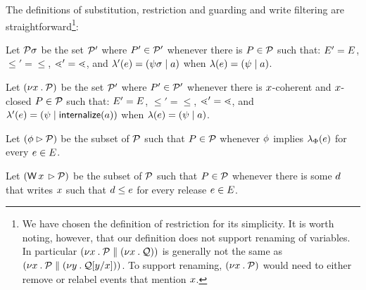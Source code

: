 The definitions of substitution, restriction and guarding and write filtering
are straightforward\footnote{We have chosen the definition of restriction for
  its simplicity.  It is worth noting, however, that our definition does not
  support renaming of variables.  In particular
  $(\nu x\mathbin.\mathcal{P}\parallel(\nu x\mathbin.\mathcal{Q}))$ is generally not the same
  as $(\nu x\mathbin.\mathcal{P}\parallel(\nu y\mathbin.\mathcal{Q}[y/x]))$.  To
  support renaming, $(\nu x\mathbin.\mathcal{P})$ would need to either remove or
  relabel events that mention $x$.}:
\begin{definition}
  Let $\mathcal{P}\sigma$ be the set $\mathcal{P}'$ where $P'\in\mathcal{P}'$ whenever
there is $P\in\mathcal{P}$ such that:
$E' = E$,
${\le'} = {\le}$, 
${\lessdot'} = {\lessdot}$,
and
$\lambda'(e) = (\psi\sigma \mid a)$ when $\lambda(e) = (\psi \mid a)$.


Let $(\nu x\mathbin.\mathcal{P})$ be the set $\mathcal{P}'$ where $P'\in\mathcal{P}'$ whenever
there is $x$-coherent and $x$-closed $P\in\mathcal{P}$ such that:
$E' = E$,
${\le'} = {\le}$, 
${\lessdot'} = {\lessdot}$,
and
$\lambda'(e) = (\psi \mid \mathsf{internalize}(a))$ when $\lambda(e) = (\psi \mid a)$.

Let $(\phi \mathbin\rhd \mathcal{P})$ be the subset of $\mathcal{P}$ such that $P\in\mathcal{P}$ whenever
$\phi$ implies $\lambda_{\Phi}(e)$ for every $e\in E$. %

Let $(\DW{\aLoc}{} \guard \aPSS)$ be the subset of $\mathcal{P}$ such that
$P\in\mathcal{P}$ whenever there is some $d$ that writes $x$ such that
$d\leq e$ for every release $e\in E$.
\end{definition}


